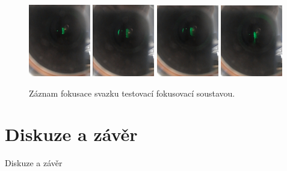 \begin{figure}[h!]
\vspace{0.15cm}
\includegraphics[width=0.24\textwidth]{Figure/05/video/9.jpg}
\hfill
\includegraphics[width=0.24\textwidth]{Figure/05/video/10.jpg}
\hfill
\includegraphics[width=0.24\textwidth]{Figure/05/video/11.jpg}
\hfill
\includegraphics[width=0.24\textwidth]{Figure/05/video/12.jpg}
\vfill

\caption{Záznam fokusace svazku testovací fokusovací soustavou.}
\label{05video}
\end{figure}

\section{Diskuze a závěr}

Diskuze a závěr
